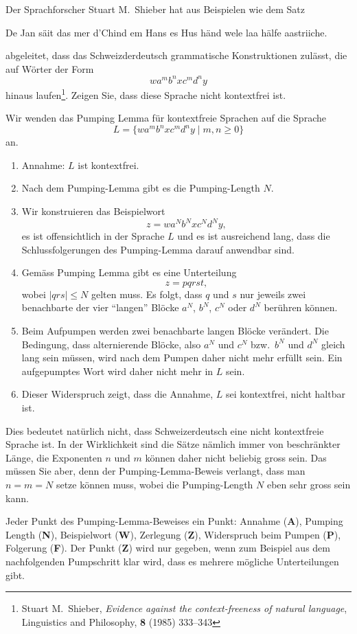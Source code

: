 Der Sprachforscher Stuart M.~Shieber hat aus Beispielen wie dem Satz
\begin{center}
De Jan säit das mer d'Chind em Hans es Hus händ wele laa hälfe aastriiche.
\end{center}
abgeleitet, dass das Schweizderdeutsch grammatische Konstruktionen
zulässt, die auf Wörter der Form
\[
wa^mb^nxc^md^ny
\]
hinaus laufen\footnote{Stuart M.~Shieber,
{\em Evidence against the context-freeness of natural language},
Linguistics and Philosophy, {\bf 8} (1985) 333--343}.
Zeigen Sie, dass diese Sprache nicht kontextfrei ist.


\begin{loesung}
Wir wenden das Pumping Lemma für kontextfreie Sprachen auf die Sprache
\[
L=\{
wa^mb^nxc^md^ny
\;|\; m,n\ge 0
\}
\]
an.
\begin{enumerate}
\item Annahme: $L$ ist kontextfrei.
\item Nach dem Pumping-Lemma gibt es die Pumping-Length $N$.
\item Wir konstruieren das Beispielwort
\[
z=wa^Nb^Nxc^Nd^Ny,
\]
es ist offensichtlich in der Sprache $L$
und es ist ausreichend lang, dass die Schlussfolgerungen des Pumping-Lemma
darauf anwendbar sind.
\item
Gemäss Pumping Lemma gibt es eine Unterteilung
\[
z=pqrst,
\]
wobei $|qrs|\le N$ gelten muss.
Es folgt, dass $q$ und $s$ nur jeweils zwei benachbarte der
vier ``langen'' Blöcke $a^N$, $b^N$, $c^N$ oder $d^N$ berühren können.
\item 
Beim Aufpumpen werden zwei benachbarte langen Blöcke verändert.
Die Bedingung, dass alternierende Blöcke, also $a^N$ und $c^N$
bzw.~$b^N$ und $d^N$ gleich lang sein müssen, wird nach dem Pumpen
daher nicht mehr erfüllt sein.
Ein aufgepumptes Wort wird daher nicht mehr in $L$ sein.
\item Dieser Widerspruch zeigt, dass die Annahme, $L$ sei kontextfrei,
nicht haltbar ist.
\qedhere
\end{enumerate}
\end{loesung}

\begin{diskussion}
Dies bedeutet natürlich nicht, dass Schweizerdeutsch eine nicht
kontextfreie Sprache ist.
In der Wirklichkeit sind die Sätze nämlich immer von beschränkter Länge,
die Exponenten $n$ und $m$ können daher nicht beliebig gross sein.
Das müssen Sie aber, denn der Pumping-Lemma-Beweis verlangt, dass man
$n=m=N$ setze können muss, wobei die Pumping-Length $N$ eben sehr gross
sein kann.
\end{diskussion}

\begin{bewertung}
Jeder Punkt des Pumping-Lemma-Beweises ein Punkt:
Annahme ({\bf A}), Pumping Length ({\bf N}), Beispielwort ({\bf W}),
Zerlegung ({\bf Z}), Widerspruch beim Pumpen ({\bf P}), 
Folgerung ({\bf F}).
Der Punkt ({\bf Z}) wird nur gegeben, wenn zum Beispiel aus dem nachfolgenden
Pumpschritt klar wird, dass es mehrere mögliche Unterteilungen gibt.
\end{bewertung}

